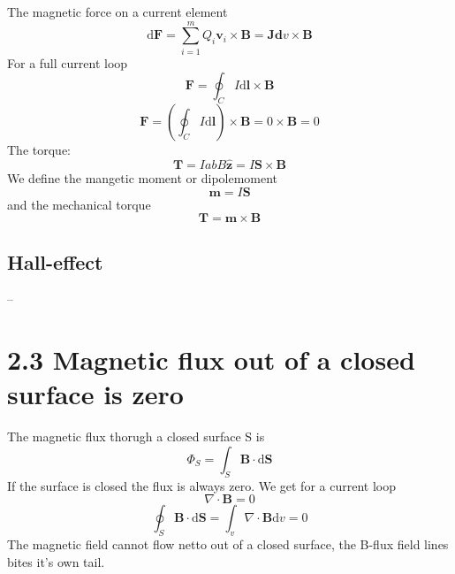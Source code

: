 \documentclass[
12pt, reprint, aip, onecolumn, notitlepage
]{revtex4-1}
\begin{document}
The magnetic force on a current element
\begin{equation}
\mathrm{d} \mathbf{F}=\sum_{i=1}^{m} Q_{i} \mathbf{v}_{i} \times \mathbf{B}=\mathbf{J d} v \times \mathbf{B}
\end{equation}
For a full current loop
\begin{equation}
\mathbf{F}=\oint_{C} I \mathrm{d} \mathbf{l} \times \mathbf{B}
\end{equation}
\begin{equation}
\mathbf{F}=\left(\oint_{C} I \mathrm{d} \mathbf{l}\right) \times \mathbf{B}=0 \times \mathbf{B}=0
\end{equation}
The torque:
\begin{equation}
\mathbf{T}=Iab B \hat{\mathbf{z}}=I \mathbf{S} \times \mathbf{B}
\end{equation}
We define the mangetic moment or dipolemoment 
\begin{equation}
\mathbf{m}=I \mathbf{S}
\end{equation}
and the mechanical torque
\begin{equation}
\mathbf{T}=\mathbf{m} \times \mathbf{B}
\end{equation}
\subsection{Hall-effect}
--

\section{2.3 Magnetic flux out of a closed surface is zero}

The magnetic flux thorugh a closed surface S is
\begin{equation}
\Phi_{S}=\int_{S} \mathbf{B} \cdot \mathrm{d} \mathbf{S}
\end{equation}
If the surface is closed the flux is always zero. We get for a current loop
\begin{equation}
\nabla \cdot \mathbf{B}=0
\end{equation}
\begin{equation}
\oint_{S} \mathbf{B} \cdot \mathrm{d} \mathbf{S}=\int_{v} \nabla \cdot \mathbf{B} \mathrm{d} v=0
\end{equation}
The magnetic field cannot flow netto out of a closed surface, the B-flux field lines bites it's own tail. 
\end{document}

